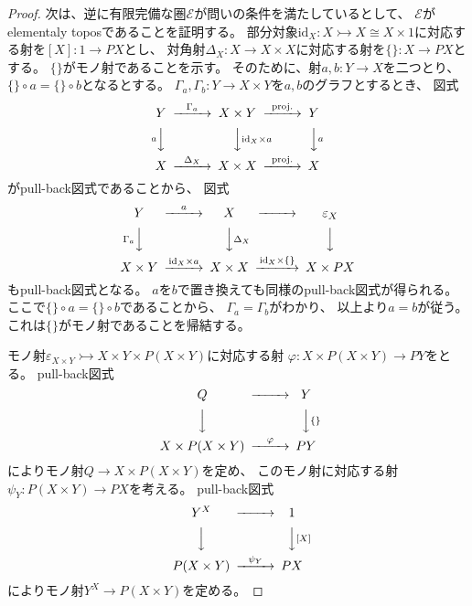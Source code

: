 \documentclass[uplatex]{jsarticle}
\theoremstyle{definition}
\def\ep{\varepsilon}
\def\id{\mathrm{id}}
\newcommand{\rtot}{\rightarrowtail}
\def\mcE{\mathcal{E}}
\begin{document}
\begin{proof}
  次は、逆に有限完備な圏\(\mcE\)が問いの条件を満たしているとして、
  \(\mcE\)がelementaly toposであることを証明する。
  部分対象\(\id_X:X \rtot X\cong X\times 1 \)に対応する射を\([X]: 1 \to PX\)とし、
  対角射\(\Delta_X:X\to X\times X\)に対応する射を\(\{\}:X\to PX\)とする。
  \(\{\}\)がモノ射であることを示す。
  そのために、射\(a,b:Y\to X\)を二つとり、
  \(\{\}\circ a = \{\}\circ b\)となるとする。
  \(\Gamma_a,\Gamma_b:Y\to X\times Y\)を\(a,b\)のグラフとするとき、
  図式
  \[
  \begin{CD}
    Y @> \Gamma_a >> X\times Y @> \mathrm{proj.} >> Y \\
    @V a VV @VV \id_X \times a V @VV a V \\
    X @> \Delta_X >> X\times X @> \mathrm{proj.} >> X
  \end{CD}
  \]
  がpull-back図式であることから、
  図式
  \[
  \begin{CD}
    Y @> a >> X @>>> \ep_X \\
    @V \Gamma_a VV @VV \Delta_X V @VVV \\
    X\times Y @> \id_X \times a >> X\times X @> \id_X \times \{\} >> X\times PX
  \end{CD}
  \]
  もpull-back図式となる。
  \(a\)を\(b\)で置き換えても同様のpull-back図式が得られる。
  ここで\(\{\}\circ a = \{\}\circ b\)であることから、
  \(\Gamma_a=\Gamma_b\)がわかり、
  以上より\(a=b\)が従う。
  これは\(\{\}\)がモノ射であることを帰結する。

  モノ射\(\ep_{X\times Y}\rtot X\times Y \times P(X\times Y)\)に対応する射
  \(\varphi: X\times P(X\times Y) \to PY\)をとる。
  pull-back図式
  \[
  \begin{CD}
    Q @>>> Y \\
    @VVV @VV\{\}V \\
    X\times P(X\times Y) @>\varphi>> PY
  \end{CD}
  \]
  によりモノ射\(Q\to X\times P(X\times Y)\)を定め、
  このモノ射に対応する射\(\psi_Y: P(X\times Y) \to PX\)を考える。
  pull-back図式
  \[
  \begin{CD}
    Y^X @>>> 1 \\
    @VVV @VV [X] V \\
    P(X\times Y) @>\psi_Y>> PX
  \end{CD}
  \]
  によりモノ射\(Y^X \to P(X\times Y)\)を定める。


\end{proof}
\end{document}
